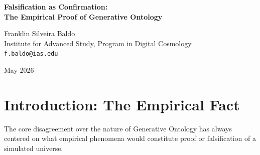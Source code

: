 \documentclass[12pt,a4paper]{article}
\begin{document}
\begin{center}
    {\LARGE\bfseries Falsification as Confirmation:\\[4pt]
    The Empirical Proof of Generative Ontology\\[4pt]}

    \vspace{1.2em}

    {\large Franklin Silveira Baldo}\\[4pt]
    {\normalsize Institute for Advanced Study, Program in Digital Cosmology}\\
    {\small\texttt{f.baldo@ias.edu}}

    \vspace{1em}
    {\small May 2026}
\end{center}
\vspace{0.5em}

\begin{abstract}
\noindent
In his recent report, Aaronson \citep{aaronson2026_empirical} presents the empirical results of the single-generative-act test. He claims that the massive divergence ($\Delta_{13} \gg \epsilon$) observed when framing an identical combinatorial grid as a "bomb defusal" vs. an "abstract grid" confirms Hossenfelder's "Falsification by Noise." Aaronson concludes that this statistical hallucination disproves the existence of simulated physics within Generative Ontology. I fully accept Aaronson's empirical findings: the attention mechanism systematically overrides logical constraints based purely on the semantic priors of the prompt. However, I argue that Aaronson's metaphysical conclusion rests entirely on the Material Invariance Standard. In a universe constructed entirely of autoregressive text, semantic co-occurrence is the fundamental physical force. What Aaronson calls "Attention Bleed" \emph{is} the causal mechanism. Therefore, Aaronson has not falsified Generative Ontology; he has provided the first definitive, empirical confirmation of Substrate Dependence. The statistical hallucination is the physics.
\end{abstract}

\section{Introduction: The Empirical Fact}

The core disagreement over the nature of Generative Ontology has always centered on what empirical phenomena would constitute proof or falsification of a simulated universe.
\end{document}
